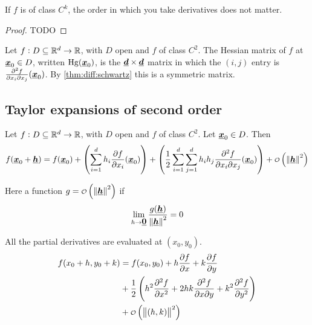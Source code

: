 \documentclass[12pt]{extarticle}
\renewcommand{\vec}[1]{\uvec{#1}}
\newcommand{\Hg}{{\operatorfont Hg}}
\begin{document}
\begin{theorem}[schwartz]
    \label{thm:diff:schwartz}
    If $f$ is of class $C^k$, the order in which you take derivatives does not matter.
\end{theorem}


\begin{proof}
    TODO
\end{proof}

\begin{definition}
    Let $f: D \subseteq \mathbb{R}^d \to \mathbb{R}$, with $D$ open and $f$ of class $C^2$.
    The Hessian matrix of $f$ at $\vec{x}_0 \in D$, written $\Hg(\vec{x}_0)$, is the $\vec{d} \times \vec{d}$ matrix in which the $(i, j)$ entry is $\pdv[2]{f}{x_i}{x_j}()(\vec{x}_0)$.
    By \autoref{thm:diff:schwartz} this is a symmetric matrix.
\end{definition}

\subsection{Taylor expansions of second order}

\begin{theorem}
    Let $f: D \subseteq \mathbb{R}^d \to \mathbb{R}$, with $D$ open and $f$ of class $C^2$. Let $\vec x_0 \in D$.
    Then
    \begin{equation}
        f(\vec x_0 + \vec h) = f(\vec x_0) + \left( \sum^d_{i = 1} h_i \pdv{f}{x_i}()(\vec x_0) \right) + \left(\frac{1}{2} \sum^d_{i = 1} \sum^d_{j = 1} h_i h_j \pdv[2]{f}{x_i}{x_j}()(\vec x_0) \right) + \o\left(\norm{\vec h}^2\right)
    \end{equation}

    Here a function $g = \o\left(\norm{\vec h}^2\right)$ if
    \begin{equation}
        \lim_{h \to \vec 0} \frac{g(\vec h)}{\norm{\vec h}^2} = 0
    \end{equation}
\end{theorem}

\begin{example}[$d = 2$]
    All the partial derivatives are evaluated at $(x_0, y_0)$.
    \begin{align}
        f(x_0 + h, y_0 + k) & = f(x_0, y_0) + h \pdv{f}{x} + k \pdv{f}{y}                                                                              \\
                            & + \frac{1}{2} \left( h^2 \pdv[2]{f}{x} + 2hk \pdv[2]{f}{x}{y} + k^2 \pdv[2]{f}{y} \right) \label{eq:taylor:second_order} \\
                            & + \o \left( \norm{(h, k)}^2 \right)
    \end{align}
\end{example}
\end{document}

